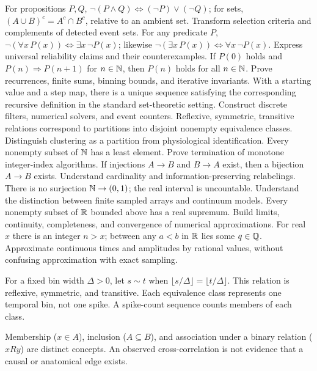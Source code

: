 {For propositions $P,Q$, $\neg(P\land Q)\Leftrightarrow
(\neg P)\lor(\neg Q)$; for sets,
$(A\cup B)^c=A^c\cap B^c$, relative to an ambient set.}
{Transform selection criteria and complements of detected event sets.}
{For any predicate $P$, $\neg(\forall x\,P(x))\Leftrightarrow
\exists x\,\neg P(x)$; likewise
$\neg(\exists x\,P(x))\Leftrightarrow\forall x\,\neg P(x)$.}
{Express universal reliability claims and their counterexamples.}
{If $P(0)$ holds and $P(n)\Rightarrow P(n+1)$ for $n\in\mathbb{N}$,
then $P(n)$ holds for all $n\in\mathbb{N}$.}
{Prove recurrences, finite sums, binning bounds, and iterative invariants.}
{With a starting value and a step map, there is a unique
sequence satisfying the corresponding recursive definition
in the standard set-theoretic setting.}
{Construct discrete filters, numerical solvers, and event counters.}
{Reflexive, symmetric, transitive relations correspond to partitions
into disjoint nonempty equivalence classes.}
{Distinguish clustering as a partition from physiological identification.}
{Every nonempty subset of $\mathbb{N}$ has a least element.}
{Prove termination of monotone integer-index algorithms.}
{If injections $A\to B$ and $B\to A$ exist, then a bijection
$A\to B$ exists.}
{Understand cardinality and information-preserving relabelings.}
{There is no surjection $\mathbb{N}\to(0,1)$; the real interval
is uncountable.}
{Understand the distinction between finite sampled arrays and continuum models.}
{Every nonempty subset of $\mathbb{R}$ bounded above has a real supremum.}
{Build limits, continuity, completeness, and convergence of numerical approximations.}
{For real $x$ there is an integer $n>x$; between any
$a<b$ in $\mathbb{R}$ lies some $q\in\mathbb{Q}$.}
{Approximate continuous times and amplitudes by rational values, without confusing
approximation with exact sampling.}

\begin{example}
For a fixed bin width $\Delta>0$, let $s\sim t$ when
$\lfloor s/\Delta\rfloor=\lfloor t/\Delta\rfloor$.
This relation is reflexive, symmetric, and transitive.
Each equivalence class represents one temporal bin, not one spike.
A spike-count sequence counts members of each class.
\end{example}

\begin{caution}
Membership ($x\in A$), inclusion ($A\subseteq B$), and association
under a binary relation ($xRy$) are distinct concepts. An observed
cross-correlation is not evidence that a causal or anatomical edge exists.
\end{caution}
